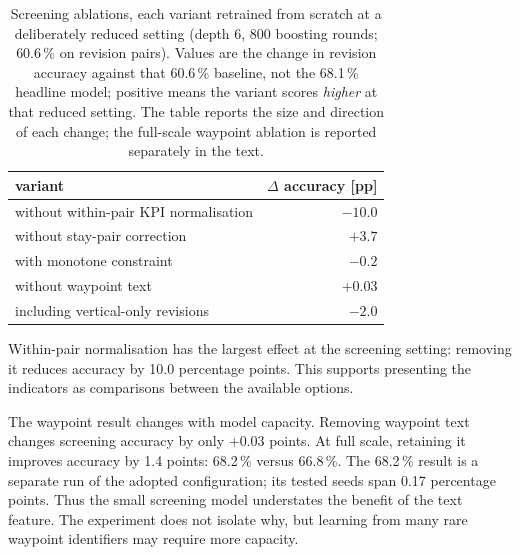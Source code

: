 \documentclass[preprint,authoryear,12pt]{elsarticle}
\begin{document}
\begin{table}[t]
\caption{Screening ablations, each variant retrained from scratch at a
deliberately reduced setting (depth 6, 800 boosting rounds; 60.6\,\% on
revision pairs). Values are the change in revision accuracy against
that 60.6\,\% baseline, not the 68.1\,\% headline model; positive means
the variant scores \emph{higher} at that reduced setting. The table reports the size and direction of each change; the full-scale
waypoint ablation is reported separately in the text.}
\label{tab:ablation}
\centering\small
\begin{tabular}{@{}lr@{}}
\toprule
variant & $\Delta$ accuracy [pp] \\
\midrule
without within-pair KPI normalisation & $-10.0$ \\
without stay-pair correction          & $+3.7$ \\
with monotone constraint              & $-0.2$ \\
without waypoint text                 & $+0.03$ \\
including vertical-only revisions     & $-2.0$ \\
\bottomrule
\end{tabular}
\end{table}

Within-pair normalisation has the largest effect at the screening
setting: removing it reduces accuracy by 10.0 percentage points.
This supports presenting the indicators as comparisons between the
available options.

The waypoint result changes with model capacity. Removing waypoint
text changes screening accuracy by only $+0.03$ points. At full scale,
retaining it improves accuracy by 1.4 points: 68.2\,\% versus
66.8\,\%. The 68.2\,\% result is a separate run of the adopted
configuration; its tested seeds span 0.17 percentage points. Thus the
small screening model understates the benefit of the text feature.
The experiment does not isolate why, but learning from many rare
waypoint identifiers may require more capacity.
\end{document}
